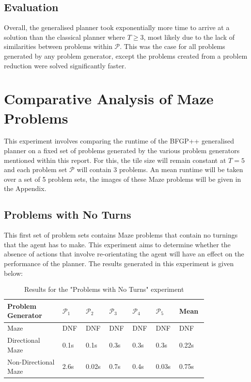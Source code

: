 \subsection{Evaluation}
Overall, the generalised planner took exponentially more time to arrive at a solution than the classical planner where $T \geq 3$, most likely due to the lack of similarities between problems within $\mathcal{P}$. This was the case for all problems generated by any problem generator, except the problems created from a problem reduction were solved significantly faster.

\section{Comparative Analysis of Maze Problems}
This experiment involves comparing the runtime of the BFGP++ generalised planner on a fixed set of problems generated by the various problem generators mentioned within this report. For this, the tile size will remain constant at $T=5$ and each problem set $\mathcal{P}$ will contain 3 problems. An mean runtime will be taken over a set of 5 problem sets, the images of these Maze problems will be given in the Appendix. 

\subsection{Problems with No Turns}
This first set of problem sets contains Maze problems that contain no turnings that the agent has to make. This experiment aims to determine whether the absence of actions that involve re-orientating the agent will have an effect on the performance of the planner. The results generated in this experiment is given below:

\begin{table}[ht]
\centering
\begin{tabular}{|p{0.25\linewidth}|p{0.09\linewidth}|p{0.09\linewidth}|p{0.09\linewidth}|p{0.09\linewidth}|p{0.09\linewidth}|p{0.12\linewidth}|}
\hline
Problem Generator & $\mathcal{P}_1$ & $\mathcal{P}_2$ & $\mathcal{P}_3$ & $\mathcal{P}_4$ & $\mathcal{P}_5$ & Mean \\\hline
Maze & DNF & DNF & DNF & DNF & DNF & DNF
\\\hline
Directional Maze & 0.1s & 0.1s & 0.3s & 0.3s & 0.3s & 0.22s
\\\hline
Non-Directional Maze & 2.6s & 0.02s & 0.7s & 0.4s & 0.03s & 0.75s
\\\hline
\end{tabular}
\caption{Results for the "Problems with No Turns" experiment}
\end{table}

